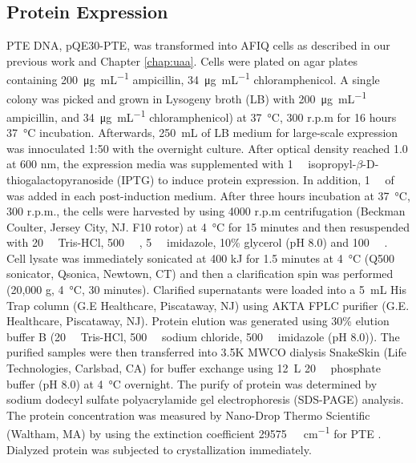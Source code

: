 \begin{refsection}
\subsection{Protein Expression}
\label{sec:pte-chap3}

PTE DNA, pQE30-PTE, was transformed into AFIQ cells as described in our previous
work \cite{Yang2014a} and Chapter \ref{chap:uaa}. Cells were plated on agar
plates containing \SI{200}{\ug\per\mL} ampicillin, \SI{34}{\ug\per\mL}
chloramphenicol. A single colony was picked and grown in Lysogeny broth (LB)
with \SI{200}{\ug\per\mL} ampicillin, and \SI{34}{\ug\per\mL} chloramphenicol)
at \SI{37}{\celsius}, 300 r.p.m for 16 hours \SI{37}{\celsius} incubation.
Afterwards, \SI{250}{\mL} of LB medium for large-scale expression was
innoculated 1:50 with the overnight culture.  After optical density reached 1.0
at 600 nm, the expression media was supplemented with \SI{1}{\milli\Molar}
isopropyl-$\beta$-D-thiogalactopyranoside (IPTG) to induce protein expression.
In addition, \SI{1}{\milli\Molar} of  was added in each
post-induction medium.  After three hours incubation at \SI{37}{\celsius}, 300
r.p.m., the cells were harvested by using 4000 r.p.m centrifugation (Beckman
Coulter, Jersey City, NJ.  F10 rotor) at \SI{4}{\celsius} for 15 minutes and
then resuspended with \SI{20}{\milli\Molar} Tris-HCl, \SI{500}{\milli\Molar}
, \SI{5}{\milli\Molar} imidazole, 10\% glycerol (pH 8.0) and
\SI{100}{\micro\Molar} . Cell lysate was immediately sonicated at 400 kJ
for 1.5 minutes at \SI{4}{\celsius} (Q500 sonicator, Qsonica, Newtown, CT) and then a
clarification spin was performed (20,000 g, \SI{4}{\celsius}, 30 minutes).
Clarified supernatants were loaded into a \SI{5}{\mL} His Trap column (G.E
Healthcare, Piscataway, NJ) using AKTA FPLC purifier (G.E.  Healthcare,
Piscataway, NJ).  Protein elution was generated using 30\% elution buffer B
(\SI{20}{\milli\Molar} Tris-HCl, \SI{500}{\milli\Molar} sodium chloride,
\SI{500}{\milli\Molar} imidazole (pH 8.0)). The purified samples were then
transferred into 3.5K MWCO dialysis SnakeSkin (Life Technologies, Carlsbad, CA)
for buffer exchange using \SI{12}{\L} \SI{20}{\milli\Molar} phosphate buffer
(pH 8.0) at \SI{4}{\celsius} overnight. The purify of protein was
determined by sodium dodecyl sulfate polyacrylamide gel electrophoresis 
(SDS-PAGE) analysis. The protein concentration was measured by Nano-Drop Thermo
Scientific (Waltham, MA) by using the extinction coefficient
\SI{29575}{\per\Molar\per\cm} for PTE \cite{Gasteiger2005, Pace1995}. Dialyzed
protein was subjected to crystallization immediately.


\end{refsection}
